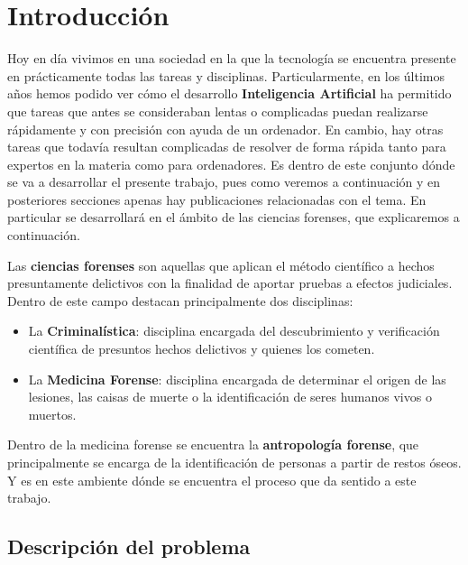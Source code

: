 
\chapter{Introducción}  \label{ch:Introduccion_informatica}

\noindent Hoy en día vivimos en una sociedad en la que la tecnología se encuentra presente en prácticamente todas las tareas y disciplinas. Particularmente, en los últimos años hemos podido ver cómo el desarrollo \textbf{Inteligencia Artificial} ha permitido que tareas que antes se consideraban lentas o complicadas puedan realizarse rápidamente y con precisión con ayuda de un ordenador. En cambio, hay otras tareas que todavía resultan complicadas de resolver de forma rápida tanto para expertos en la materia como para ordenadores. Es dentro de este conjunto dónde se va a desarrollar el presente trabajo, pues como veremos a continuación y en posteriores secciones apenas hay publicaciones relacionadas con el tema. En particular se desarrollará en el ámbito de las ciencias forenses, que explicaremos a continuación.

\medskip

\noindent Las \textbf{ciencias forenses} son aquellas que aplican el método científico a hechos presuntamente delictivos con la finalidad de aportar pruebas a efectos judiciales. Dentro de este campo destacan principalmente dos disciplinas: 

\begin{itemize}
    \item La \textbf{Criminalística}: disciplina encargada del descubrimiento y verificación científica de presuntos hechos delictivos y quienes los cometen.
    \item La \textbf{Medicina Forense}: disciplina encargada de determinar el origen de las lesiones, las caisas de muerte o la identificación de seres humanos vivos o muertos.
\end{itemize}

\medskip

\noindent Dentro de la medicina forense se encuentra la \textbf{antropología forense}, que principalmente se encarga de la identificación de personas a partir de restos óseos. Y es en este ambiente dónde se encuentra el proceso que da sentido a este trabajo.


\section{Descripción del problema}

